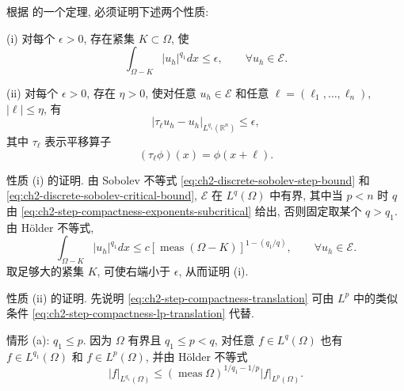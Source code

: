 \begin{Proof}
根据  的一个定理, 必须证明下述两个性质:

(i) 对每个 $\epsilon>0$, 存在紧集 $K\subset\Omega$, 使
\begin{equation}
\int_{\Omega-K}|u_h|^{q_1}dx\leq\epsilon,
\qquad\forall u_h\in\mathcal E.
\label{eq:ch2-step-compactness-tightness}
\end{equation}

(ii) 对每个 $\epsilon>0$, 存在 $\eta>0$, 使对任意 $u_h\in\mathcal E$ 和任意 $\ell=(\ell_1,\ldots,\ell_n)$, $|\ell|\leq\eta$, 有
\begin{equation}
|\tau_\ell u_h-u_h|_{L^{q_1}(\mathbb R^n)}\leq\epsilon,
\label{eq:ch2-step-compactness-translation}
\end{equation}
其中 $\tau_\ell$ 表示平移算子
\begin{equation}
(\tau_\ell\phi)(x)=\phi(x+\ell).
\label{eq:ch2-translation-operator}
\end{equation}

性质 (i) 的证明. 由 Sobolev 不等式 \eqref{eq:ch2-discrete-sobolev-step-bound} 和 \eqref{eq:ch2-discrete-sobolev-critical-bound}, $\mathcal E$ 在 $L^q(\Omega)$ 中有界, 其中当 $p<n$ 时 $q$ 由 \eqref{eq:ch2-step-compactness-exponents-subcritical} 给出, 否则固定取某个 $q>q_1$. 由 Hölder 不等式,
\begin{equation}
\int_{\Omega-K}|u_h|^{q_1}dx
\leq c[\operatorname{meas}(\Omega-K)]^{1-(q_1/q)},
\qquad\forall u_h\in\mathcal E.
\label{eq:ch2-step-compactness-tightness-bound}
\end{equation}
取足够大的紧集 $K$, 可使右端小于 $\epsilon$, 从而证明 (i).

性质 (ii) 的证明. 先说明 \eqref{eq:ch2-step-compactness-translation} 可由 $L^p$ 中的类似条件 \eqref{eq:ch2-step-compactness-lp-translation} 代替.

\hypertarget{chapter-02-page-142}{}
情形 (a): $q_1\leq p$. 因为 $\Omega$ 有界且 $q_1\leq p<q$, 对任意 $f\in L^q(\Omega)$ 也有 $f\in L^{q_1}(\Omega)$ 和 $f\in L^p(\Omega)$, 并由 Hölder 不等式
\[
|f|_{L^{q_1}(\Omega)}
\leq(\operatorname{meas}\Omega)^{1/q_1-1/p}|f|_{L^p(\Omega)}.
\]


\end{Proof}
